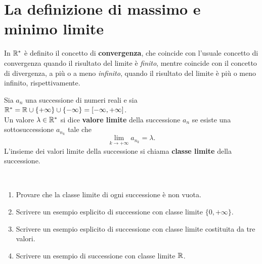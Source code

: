 \section{La definizione di massimo e minimo limite}
\begin{remember}
In $\mathbb{R}^{\ast}$ è definito il concetto di \textbf{convergenza}, che coincide con l'usuale concetto di convergenza quando il risultato del limite è \textit{finito}, mentre coincide con il concetto di divergenza, a più o a meno \textit{infinito}, quando il risultato del limite è più o meno infinito, rispettivamente.
\end{remember}
\begin{define}
Sia $a_n$ una successione di numeri reali e sia $\mathbb{R}^{\ast}=\mathbb{R}\cup \{+\infty\}\cup \{-\infty\}=\left[-\infty,+\infty\right]$.\\
Un valore $\lambda\in \mathbb{R}^{\ast}$ si dice \textbf{valore limite} della successione $a_n$ se esiste una sottosuccessione $a_{n_k}$ tale che
\begin{equation}
	\lim_{k\to +\infty} a_{n_k}=\lambda.
\end{equation}
L'insieme dei valori limite della successione si chiama \textbf{classe limite} della successione.
\end{define}
\begin{exercises}~
\begin{enumerate}
	\item Provare che la classe limite di ogni successione è non vuota.
	\item Scrivere un esempio esplicito di successione con classe limite $\{0, +\infty \}$.
	\item Scrivere un esempio esplicito di successione con classe limite costituita da tre valori.
	\item Scrivere un esempio di successione con classe limite $\mathbb{R}$.
\end{enumerate}
\end{exercises}
